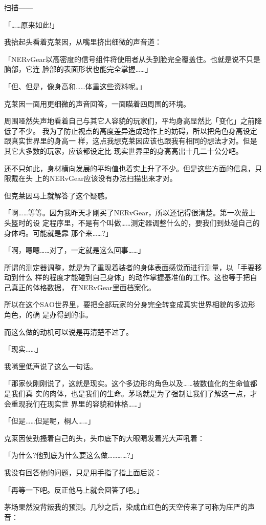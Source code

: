 \documentclass[11pt]{book}
\begin{document}
扫描——

「……原来如此!」

我抬起头看着克莱因，从嘴里挤出细微的声音道：

「NERvGear以高密度的信号组件将使用者从头到脸完全覆盖住。也就是说不只是脑部，它连
脸部的表面形状也能完全掌握……」

「但、但是，像身高和……体重这些资料呢。」

克莱因一面用更细微的声音回答，一面瞄着四周围的环境。

周围哑然失声地看着自己与其它人容貌的玩家们，平均身高显然比「变化」之前降低了不少。
我为了防止视点的高度差异造成动作上的妨碍，所以把角色身高设定跟真实世界里的身高一
样，这点我想克莱因应该也跟我有相同的想法才对。但是其它大多数的玩家，应该都设定比
现实世界里的身高高出十几二十公分吧。

还不只如此，身材横向发展的平均值也着实上升了不少。但是这些方面的信息，只限戴在头
上的NERvGear应该没有办法扫描出来才对。

但克莱因马上就解答了这个疑惑。

「啊……等等。因为我昨天才刚买了NERvGear，所以还记得很清楚。第一次戴上头盔时的设
定程序里，不是有个叫做……测定器调整什么的，要我们到处碰自己的身体吗。可能就是靠
那个来……?」

「啊，嗯嗯……对了，一定就是这么回事……」

所谓的测定器调整，就是为了重现着装者的身体表面感觉而进行测量，以「手要移动到什么
样的程度才能碰到自己身体」的动作掌握基准值的工作。这也等于把自己真正的体格数据，
在NERvGear里面档案化。

所以在这个SAO世界里，要把全部玩家的分身完全转变成真实世界相貌的多边形角色，的确
是办得到的事。

而这么做的动机可以说是再清楚不过了。

「现实……」

我嘴里低声说了这么一句话。

「那家伙刚刚说了，这就是现实。这个多边形的角色以及……被数值化的生命值都是我们真
实的肉体，也是我们的生命。茅场就是为了强制让我们了解这一点，才会重现我们在现实世
界里的容貌和体格……」

「但是……但是呢，桐人……」

克莱因使劲搔着自己的头，头巾底下的大眼睛发着光大声吼着：

「为什么?他到底为什么要这么做…………?」

我没有回答他的问题，只是用手指了指上面后说：

「再等一下吧。反正他马上就会回答了吧。」

茅场果然没背叛我的预测。几秒之后，染成血红色的天空传来了可称为庄严的声音：
\end{document}
